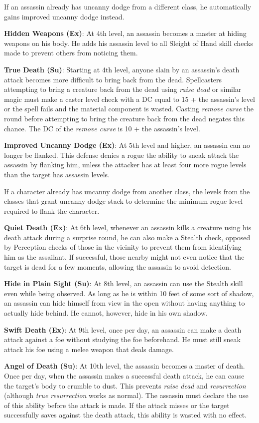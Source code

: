 If an assassin already has uncanny dodge from a different class, he automatically gains improved uncanny dodge instead.
				
\textbf{Hidden Weapons (Ex)}: At 4th level, an assassin becomes a master at hiding weapons on his body. He adds his assassin level to all Sleight of Hand skill checks made to prevent others from noticing them.
				
\textbf{True Death (Su)}: Starting at 4th level, anyone slain by an assassin's death attack becomes more difficult to bring back from the dead. Spellcasters attempting to bring a creature back from the dead using \textit{raise dead} or similar magic must make a caster level check with a DC equal to 15 + the assassin's level or the spell fails and the material component is wasted. Casting \textit{remove curse} the round before attempting to bring the creature back from the dead negates this chance. The DC of the \textit{remove curse} is 10 + the assassin's level.
				
\textbf{Improved Uncanny Dodge (Ex)}: At 5th level and higher, an assassin can no longer be flanked. This defense denies a rogue the ability to sneak attack the assassin by flanking him, unless the attacker has at least four more rogue levels than the target has assassin levels.
				
If a character already has uncanny dodge from another class, the levels from the classes that grant uncanny dodge stack to determine the minimum rogue level required to flank the character.
				
\textbf{Quiet Death (Ex)}: At 6th level, whenever an assassin kills a creature using his death attack during a surprise round, he can also make a Stealth check, opposed by Perception checks of those in the vicinity to prevent them from identifying him as the assailant. If successful, those nearby might not even notice that the target is dead for a few moments, allowing the assassin to avoid detection. 
				
\textbf{Hide in Plain Sight (Su)}: At 8th level, an assassin can use the Stealth skill even while being observed. As long as he is within 10 feet of some sort of shadow, an assassin can hide himself from view in the open without having anything to actually hide behind. He cannot, however, hide in his own shadow.
				
\textbf{Swift Death (Ex)}: At 9th level, once per day, an assassin can make a death attack against a foe without studying the foe beforehand. He must still sneak attack his foe using a melee weapon that deals damage.
				
\textbf{Angel of Death (Su)}: At 10th level, the assassin becomes a master of death. Once per day, when the assassin makes a successful death attack, he can cause the target's body to crumble to dust. This prevents \textit{raise dead} and \textit{resurrection} (although \textit{true resurrection} works as normal). The assassin must declare the use of this ability before the attack is made. If the attack misses or the target successfully saves against the death attack, this ability is wasted with no effect.
        	
